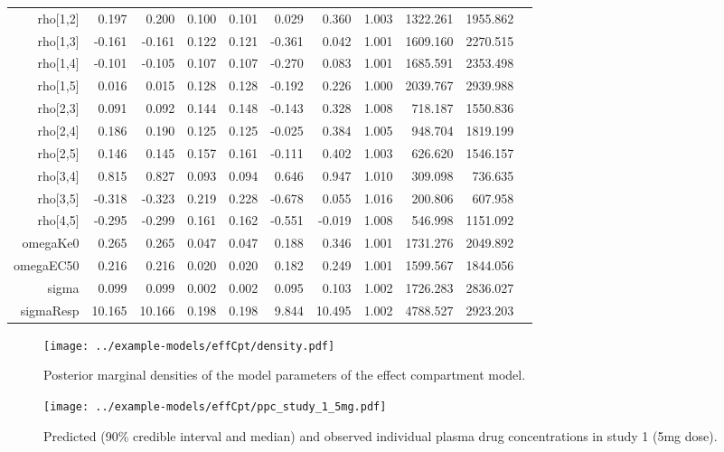 \documentclass[12pt, reqno, oneside]{amsbook}
\numberwithin{equation}{chapter}
\numberwithin{figure}{chapter}
\numberwithin{table}{chapter}
\theoremstyle{remark}
\begin{document}
\begin{table}[htbp]
\begin{tabular}{r r r r r r r r r r r}
rho[1,2] & 0.197 & 0.200 & 0.100 & 0.101 & 0.029 & 0.360 & 1.003 & 1322.261 & 1955.862\\
rho[1,3] & -0.161 & -0.161 & 0.122 & 0.121 & -0.361 & 0.042 & 1.001 & 1609.160 & 2270.515\\
rho[1,4] & -0.101 & -0.105 & 0.107 & 0.107 & -0.270 & 0.083 & 1.001 & 1685.591 & 2353.498\\
rho[1,5] & 0.016 & 0.015 & 0.128 & 0.128 & -0.192 & 0.226 & 1.000 & 2039.767 & 2939.988\\
rho[2,3] & 0.091 & 0.092 & 0.144 & 0.148 & -0.143 & 0.328 & 1.008 & 718.187 & 1550.836\\
rho[2,4] & 0.186 & 0.190 & 0.125 & 0.125 & -0.025 & 0.384 & 1.005 & 948.704 & 1819.199\\
rho[2,5] & 0.146 & 0.145 & 0.157 & 0.161 & -0.111 & 0.402 & 1.003 & 626.620 & 1546.157\\
rho[3,4] & 0.815 & 0.827 & 0.093 & 0.094 & 0.646 & 0.947 & 1.010 & 309.098 & 736.635\\
rho[3,5] & -0.318 & -0.323 & 0.219 & 0.228 & -0.678 & 0.055 & 1.016 & 200.806 & 607.958\\
rho[4,5] & -0.295 & -0.299 & 0.161 & 0.162 & -0.551 & -0.019 & 1.008 & 546.998 & 1151.092\\
omegaKe0 & 0.265 & 0.265 & 0.047 & 0.047 & 0.188 & 0.346 & 1.001 & 1731.276 & 2049.892\\
omegaEC50 & 0.216 & 0.216 & 0.020 & 0.020 & 0.182 & 0.249 & 1.001 & 1599.567 & 1844.056\\
sigma & 0.099 & 0.099 & 0.002 & 0.002 & 0.095 & 0.103 & 1.002 & 1726.283 & 2836.027\\
sigmaResp & 10.165 & 10.166 & 0.198 & 0.198 & 9.844 & 10.495 & 1.002 & 4788.527 & 2923.203\\
\end{tabular}
\end{table}

\begin{figure}[htbp]
\centering
\texttt{[image: ../example-models/effCpt/density.pdf]}
\caption{\label{effcpt_mcmc_density}Posterior marginal densities of the model parameters of the effect compartment model.}
\end{figure}

\begin{figure}[htbp]
\centering
\texttt{[image: ../example-models/effCpt/ppc\_study\_1\_5mg.pdf]}
\caption{\label{effcpt_ppc_5mg}Predicted (90\% credible interval and median) and observed individual plasma drug concentrations in study 1 (5mg dose).}
\end{figure}
\end{document}
